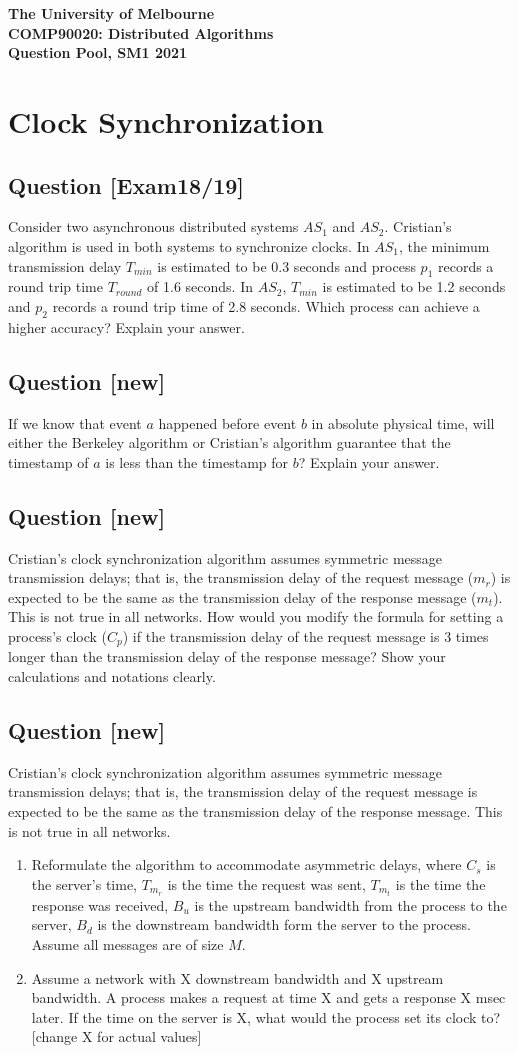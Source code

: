 \documentclass[11pt]{article}
\newcounter{question}
\newcommand{\question}[1]{
    \stepcounter{question}
    \subsection*{Question \thequestion \hfill
      {\normalsize [{#1}]}} }
\begin{document}
\vspace{5ex}
\begin{center}
\textbf{\sc The University of Melbourne}\\[0.5ex]
\textbf{\sc COMP90020: Distributed Algorithms}\\[1ex]
\textbf{\large Question Pool, SM1 2021}\\
\end{center}

\newpage


\section {Clock Synchronization}

\question{Exam18/19} 
Consider two asynchronous distributed systems $AS_1$ and $AS_2$. Cristian's algorithm is used in both systems to synchronize clocks. In $AS_1$, the minimum transmission delay $T_{min}$ is estimated to be 0.3 seconds and process $p_1$ records a round trip time $T_{round}$ of 1.6 seconds. In $AS_2$, $T_{min}$ is estimated to be 1.2 seconds and $p_2$ records a round trip time of 2.8 seconds. Which process can achieve a higher accuracy? Explain your answer.

\question{new} 
If we know that event $a$ happened before event $b$ in absolute physical time, will either the Berkeley algorithm or Cristian's algorithm guarantee that the timestamp of $a$ is less than the timestamp for $b$? Explain your answer.

\question{new}
Cristian's clock synchronization algorithm assumes symmetric message transmission delays; that is, the transmission delay of the request message ($m_r$) is expected to be the same as the transmission delay of the response message ($m_t$). This is not true in all networks. How would you modify the formula for setting a process's clock ($C_p$) if the transmission delay of the request message is 3 times longer than the transmission delay of the response message? Show your calculations and notations clearly.

\question{new}
Cristian's clock synchronization algorithm assumes symmetric message transmission delays; that is, the transmission delay of the request message is expected to be the same as the transmission delay of the response message. This is not true in all networks.
\begin{enumerate}
	\item Reformulate the algorithm to accommodate asymmetric delays, where $C_s$ is the server's time, $T_{m_r}$ is the time the request was sent, $T_{m_t}$ is the time the response was received, $B_u$ is the upstream bandwidth from the process to the server, $B_d$ is the downstream bandwidth form the server to the process. Assume all messages are of size $M$.
	\item Assume a network with X downstream bandwidth and X upstream bandwidth. A process makes a request at time X and gets a response X msec later. If the time on the server is X, what would the process set its clock to?  [change X for actual values]
\end{enumerate}
\end{document}
